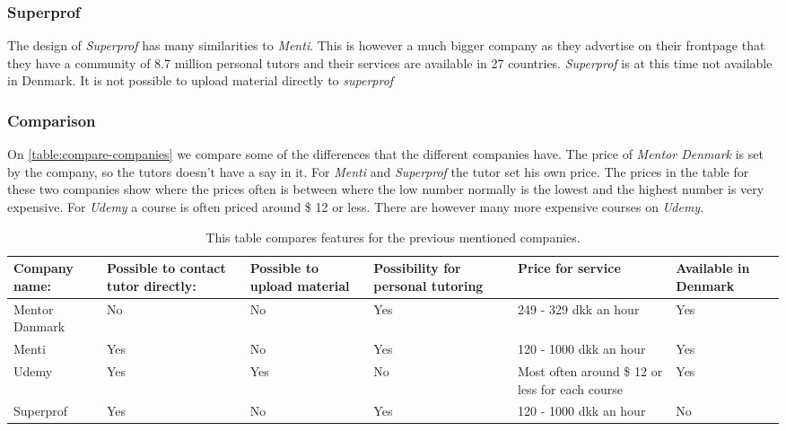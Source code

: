 \subsubsection{Superprof}
The design of \textit{Superprof} has many similarities to \textit{Menti}.
This is however a much bigger company as they advertise on their frontpage that they have a community of 8.7 million personal tutors \cite{superprof} and their services are available in 27 countries.
\textit{Superprof} is at this time not available in Denmark.
It is not possible to upload material directly to \textit{superprof}

\subsubsection{Comparison}
On \autoref{table:compare-companies} we compare some of the differences that the different companies have.
The price of \textit{Mentor Denmark} is set by the company, so the tutors doesn't have a say in it.
For \textit{Menti} and \textit{Superprof} the tutor set his own price. 
The prices in the table for these two companies show where the prices often is between where the low number normally is the lowest and the highest number is very expensive.
For \textit{Udemy} a course is often priced around \$ 12 or less. 
There are however many more expensive courses on \textit{Udemy}.

\begin{table}[h]
    \begin{tabular}{|p{2cm}|p{2cm}|p{2cm}|p{2cm}|p{2cm}|p{2cm}|}
    \hline
    Company name:  & Possible to contact tutor directly: & Possible to upload material & Possibility for personal tutoring & Price for service                               & Available in Denmark \\ \hline
    Mentor Danmark & No                                  & No                          & Yes                               & 249 - 329 dkk an hour                           & Yes                  \\ \hline
    Menti          & Yes                                 & No                          & Yes                               & 120 - 1000 dkk an hour                          & Yes                  \\ \hline
    Udemy          & Yes                                 & Yes                         & No                                & Most often around \$ 12 or less for each course & Yes                  \\ \hline
    Superprof      & Yes                                 & No                          & Yes                               & 120 - 1000 dkk an hour                          & No                   \\ \hline
    \end{tabular}
    \caption{This table compares features for the previous mentioned companies.}
    \label{table:compare-companies}
\end{table}